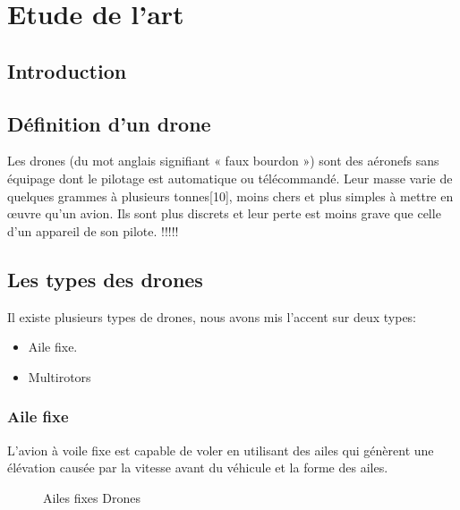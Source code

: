 
	
	
\chapter{Etude de l'art }
\newpage
	
\section{Introduction}

	
	
\section{Définition d'un drone}
	
Les drones (du mot anglais signifiant « faux bourdon ») sont des aéronefs sans équipage dont le pilotage est automatique ou télécommandé. Leur masse varie de quelques grammes à plusieurs tonnes[10], moins chers et plus simples à mettre en œuvre qu'un avion. Ils sont plus discrets et leur perte est moins grave que celle d'un appareil de son pilote.  !!!!!
	
	
	
	\section{Les types des drones}
	Il existe plusieurs types de drones, nous avons mis l'accent sur deux types:
	\begin{itemize}
	 \item Aile fixe.
	 \item Multirotors 
	\end{itemize}
	\subsection{Aile fixe }
	L'avion à voile fixe est capable de voler en utilisant des ailes qui génèrent une élévation causée par la vitesse avant du véhicule et la forme des ailes.
	
	
	\begin{figure}[h] 
	\begin{center} 
		\centering
		
	\end{center}
	
	\caption{Ailes fixes Drones}
	\end{figure}
